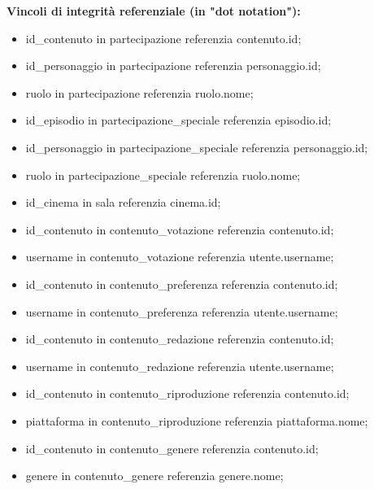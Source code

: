\documentclass[a4paper]{article}
\begin{document}
{\large \textbf{Vincoli di integrità referenziale (in "dot notation"):}}\\
\begin{itemize}
  \item id\_contenuto in partecipazione referenzia contenuto.id;\\
  \item id\_personaggio in partecipazione referenzia personaggio.id;\\
  \item ruolo in partecipazione referenzia ruolo.nome;\\
  \item id\_episodio in partecipazione\_speciale referenzia episodio.id;\\
  \item id\_personaggio in partecipazione\_speciale referenzia personaggio.id;\\
  \item ruolo in partecipazione\_speciale referenzia ruolo.nome;\\
  \item id\_cinema in sala referenzia cinema.id;\\
  \item id\_contenuto in contenuto\_votazione referenzia contenuto.id;\\
  \item username in contenuto\_votazione referenzia utente.username;\\
  \item id\_contenuto in contenuto\_preferenza referenzia contenuto.id;\\
  \item username in contenuto\_preferenza referenzia utente.username;\\
  \item id\_contenuto in contenuto\_redazione referenzia contenuto.id;\\
  \item username in contenuto\_redazione referenzia utente.username;\\
  \item id\_contenuto in contenuto\_riproduzione referenzia contenuto.id;\\
  \item piattaforma in contenuto\_riproduzione referenzia piattaforma.nome;\\
  \item id\_contenuto in contenuto\_genere referenzia contenuto.id;\\
  \item genere in contenuto\_genere referenzia genere.nome;\\

\end{itemize}
\end{document}
